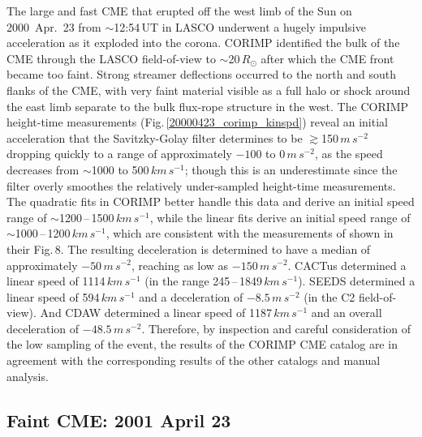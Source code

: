 \documentclass[referee,a4paper,12pt,traditabstract]{swsc}
\begin{document}
\begin{linenumbers}
The large and fast CME that erupted off the west limb of the Sun on 2000~Apr.~23 from $\sim$12:54\,UT in LASCO underwent a hugely impulsive acceleration as it exploded into the corona. CORIMP identified the bulk of the CME through the LASCO field-of-view to $\sim$20\,$R_\odot$ after which the CME front became too faint. Strong streamer deflections occurred to the north and south flanks of the CME, with very faint material visible as a full halo or shock around the east limb separate to the bulk flux-rope structure in the west. The CORIMP height-time measurements (Fig.\,\ref{20000423_corimp_kinspd}) reveal an initial acceleration that the Savitzky-Golay filter determines to be $\gtrsim$150\,$m\,s^{-2}$ dropping quickly to a range of approximately $-100$ to 0\,$m\,s^{-2}$, as the speed decreases from $\sim$1000 to 500\,$km\,s^{-1}$; though this is an underestimate since the filter overly smoothes the relatively under-sampled height-time measurements. The quadratic fits in CORIMP better handle this data and derive an initial speed range of $\sim$1200\,--\,1500\,$km\,s^{-1}$, while the linear fits derive an initial speed range of $\sim$1000\,--\,1200\,$km\,s^{-1}$, which are consistent with the measurements of \cite{2009A&A...495..325B} shown in their Fig.\,8. The resulting deceleration is determined to have a median of approximately $-50\,m\,s^{-2}$, reaching as low as $-150\,m\,s^{-2}$. CACTus determined a linear speed of 1114$\,km\,s^{-1}$ (in the range 245\,--\,1849\,$km\,s^{-1}$). SEEDS determined a linear speed of 594\,$km\,s^{-1}$ and a deceleration of $-8.5\,m\,s^{-2}$ (in the C2 field-of-view). And CDAW determined a linear speed of 1187$\,km\,s^{-1}$ and an overall deceleration of $-48.5\,m\,s^{-2}$. Therefore, by inspection and careful consideration of the low sampling of the event, the results of the CORIMP CME catalog are in agreement with the corresponding results of the other catalogs and manual analysis.


\subsection{Faint CME: 2001 April 23}
\label{sect_20010423}



\end{linenumbers}
\end{document}
